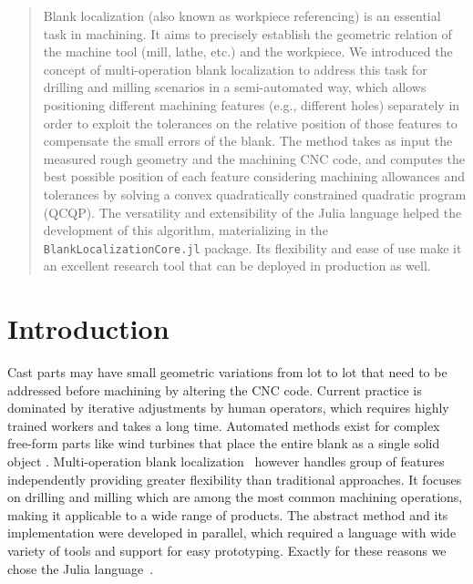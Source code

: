 \documentclass{juliacon}
\begin{document}


\maketitle

\begin{abstract}

Blank localization (also known as workpiece referencing) is an essential task in machining.
It aims to precisely establish the geometric relation of the machine tool (mill, lathe, etc.) and the workpiece.
We introduced the concept of multi-operation blank localization to address this task for drilling and milling scenarios in a semi-automated way,
which allows positioning different machining features (e.g., different holes) separately in order to exploit the tolerances on the relative position of those features to compensate the small errors of the blank.
The method takes as input the measured rough geometry and the machining CNC code, and computes the best possible position of each feature considering machining allowances and tolerances by solving a convex quadratically constrained quadratic program (QCQP).
The versatility and extensibility of the Julia language helped the development of this algorithm, materializing in the \texttt{BlankLocalizationCore.jl} package.
Its flexibility and ease of use make it an excellent research tool that can be deployed in production as well.
\end{abstract}

\section{Introduction}
\label{sec:intro}
Cast parts may have small geometric variations from lot to lot that need to be addressed before machining by altering the CNC code.
Current practice is dominated by iterative adjustments by human operators, which requires highly trained workers and takes a long time.
Automated methods exist for complex free-form parts like wind turbines that place the entire blank as a single solid object \cite{ding:2021_CoarsefineOptimizationMethod}\cite{tan:2014_UnconstrainedApproachBlank}.
Multi-operation blank localization~\cite{cserteg:2023_Annals} however handles group of features independently providing greater flexibility than traditional approaches.
It focuses on drilling and milling which are among the most common machining operations, making it applicable to a wide range of products.
The abstract method and its implementation were developed in parallel, which required a language with wide variety of tools and support for easy prototyping.
Exactly for these reasons we chose the Julia language~\cite{bezanson2017julia}.
\end{document}
